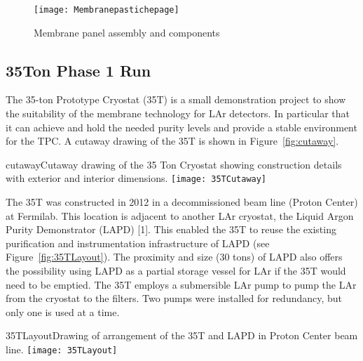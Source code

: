 \begin{figure}
\centering 
{\texttt{[image: Membranepastichepage]}}
\caption{Membrane panel assembly and components}
\label{3panel}
\end{figure}


\subsection{35Ton Phase 1 Run}

The 35-ton Prototype Cryostat (35T) is a small demonstration project to show the suitability of the 
membrane technology for LAr detectors. In particular that it can achieve and hold the needed purity 
levels and provide a stable environment for the TPC. A cutaway drawing of the 35T is shown in 
Figure~\ref{fig:cutaway}.


\begin{cdrfigure}{cutaway}{Cutaway drawing of the 35 Ton Cryostat showing construction details with exterior and interior dimensions.}
  \texttt{[image: 35TCutaway]}
\end{cdrfigure}

The 35T was constructed in 2012 in a decommissioned beam line (Proton Center) at Fermilab. This 
location is adjacent to another LAr cryostat, the Liquid Argon Purity Demonstrator (LAPD) [1].\fixme{}
 This 
enabled the 35T to reuse the existing purification and instrumentation infrastructure of LAPD (see 
Figure~\ref{fig:35TLayout}). The proximity and size (30 tons) of LAPD also offers the possibility using LAPD as 
a partial storage vessel for LAr if the 35T would need to be emptied. The 35T employs a submersible LAr 
pump to pump the LAr from the cryostat to the filters. Two pumps were installed for redundancy, but 
only one is used at a time.

\begin{cdrfigure}[35T Layout in PC4]{35TLayout}{Drawing of arrangement of the 35T and LAPD in Proton Center beam line.}
  \texttt{[image: 35TLayout]}
\end{cdrfigure}

